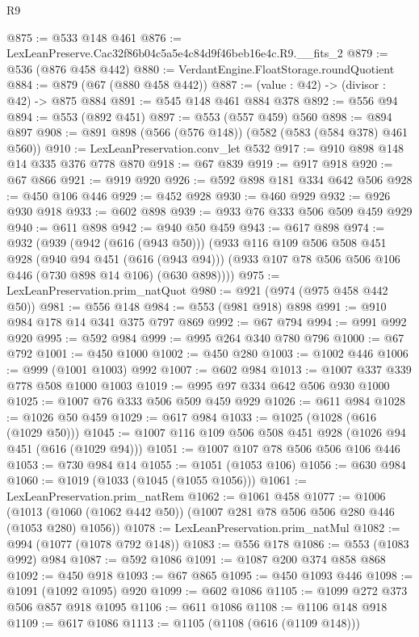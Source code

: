 \begin{lexlean}{R9}
\begin{coremodule}
@875 := @533 @148 @461
@876 := LexLeanPreserve.Cac32f86b04c5a5e4c84d9f46beb16e4c.R9.__fits_2
@879 := @536 (@876 @458 @442)
@880 := VerdantEngine.FloatStorage.roundQuotient
@884 := @879 (@67 (@880 @458 @442))
@887 := (value : @42) -> (divisor : @42) -> @875 @884
@891 := @545 @148 @461 @884 @378
@892 := @556 @94
@894 := @553 (@892 @451)
@897 := @553 (@557 @459) @560
@898 := @894 @897
@908 := @891 @898 (@566 (@576 @148)) (@582 (@583 (@584 @378) @461 @560))
@910 := LexLeanPreservation.conv_let @532
@917 := @910 @898 @148 @14 @335 @376 @778 @870
@918 := @67 @839
@919 := @917 @918
@920 := @67 @866
@921 := @919 @920
@926 := @592 @898 @181 @334 @642 @506
@928 := @450 @106 @446
@929 := @452 @928
@930 := @460 @929
@932 := @926 @930 @918
@933 := @602 @898
@939 := @933 @76 @333 @506 @509 @459 @929
@940 := @611 @898
@942 := @940 @50 @459
@943 := @617 @898
@974 := @932
    (@939
      (@942 (@616 (@943 @50)))
      (@933
        @116
        @109
        @506
        @508
        @451
        @928
        (@940 @94 @451 (@616 (@943 @94)))
        (@933 @107 @78 @506 @506 @106 @446 (@730 @898 @14 @106) (@630 @898))))
@975 := LexLeanPreservation.prim_natQuot
@980 := @921 (@974 (@975 @458 @442 @50))
@981 := @556 @148
@984 := @553 (@981 @918) @898
@991 := @910 @984 @178 @14 @341 @375 @797 @869
@992 := @67 @794
@994 := @991 @992 @920
@995 := @592 @984
@999 := @995 @264 @340 @780 @796
@1000 := @67 @792
@1001 := @450 @1000
@1002 := @450 @280
@1003 := @1002 @446
@1006 := @999 (@1001 @1003) @992
@1007 := @602 @984
@1013 := @1007 @337 @339 @778 @508 @1000 @1003
@1019 := @995 @97 @334 @642 @506 @930 @1000
@1025 := @1007 @76 @333 @506 @509 @459 @929
@1026 := @611 @984
@1028 := @1026 @50 @459
@1029 := @617 @984
@1033 := @1025 (@1028 (@616 (@1029 @50)))
@1045 := @1007 @116 @109 @506 @508 @451 @928 (@1026 @94 @451 (@616 (@1029 @94)))
@1051 := @1007 @107 @78 @506 @506 @106 @446
@1053 := @730 @984 @14
@1055 := @1051 (@1053 @106)
@1056 := @630 @984
@1060 := @1019 (@1033 (@1045 (@1055 @1056)))
@1061 := LexLeanPreservation.prim_natRem
@1062 := @1061 @458
@1077 := @1006
    (@1013 (@1060 (@1062 @442 @50)) (@1007 @281 @78 @506 @506 @280 @446 (@1053 @280) @1056))
@1078 := LexLeanPreservation.prim_natMul
@1082 := @994 (@1077 (@1078 @792 @148))
@1083 := @556 @178
@1086 := @553 (@1083 @992) @984
@1087 := @592 @1086
@1091 := @1087 @200 @374 @858 @868
@1092 := @450 @918
@1093 := @67 @865
@1095 := @450 @1093 @446
@1098 := @1091 (@1092 @1095) @920
@1099 := @602 @1086
@1105 := @1099 @272 @373 @506 @857 @918 @1095
@1106 := @611 @1086
@1108 := @1106 @148 @918
@1109 := @617 @1086
@1113 := @1105 (@1108 (@616 (@1109 @148)))

\end{coremodule}
\end{lexlean}
